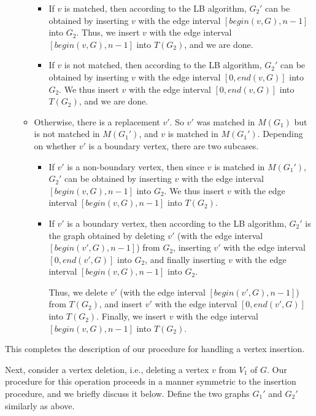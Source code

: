\documentclass[11pt]{article}
\begin{document}
\begin{itemize}
\begin{itemize}
\begin{itemize}
\item
If $v$ is matched, then according to the LB algorithm, $G_2'$ can be
obtained by inserting $v$ with the edge interval $[begin(v,G),n-1]$ into $G_2$. Thus,
we insert $v$ with the edge interval $[begin(v,G),n-1]$ into $T(G_2)$, and we are
done.

\item
If $v$ is not matched, then according to the LB algorithm, $G_2'$ can be
obtained by inserting $v$ with the edge interval $[0, end(v,G)]$ into $G_2$.
We thus insert $v$ with the edge interval $[0, end(v,G)]$ into $T(G_2)$, and we are done.

\end{itemize}

\item
Otherwise, there is a replacement $v'$. So $v'$
was matched in $M(G_1)$ but is not matched in $M(G_1')$, and $v$ is
matched in $M(G_1')$. Depending on whether $v'$ is a boundary vertex, there are two
subcases.

\begin{itemize}
\item
If $v'$ is a non-boundary vertex, then since $v$ is
matched in $M(G_1')$, $G_2'$ can be
obtained by inserting $v$ with the edge interval $[begin(v,G),n-1]$ into $G_2$.
We thus insert $v$ with the edge interval $[begin(v,G),n-1]$ into $T(G_2)$.


\item
If $v'$ is a boundary vertex, then according to the LB algorithm,
$G_2'$ is the graph obtained by deleting $v'$ (with the edge interval
$[begin(v',G),n-1]$) from $G_2$, inserting $v'$ with the edge interval $[0,end(v',G)]$ into
$G_2$, and finally inserting $v$ with the edge interval $[begin(v,G),n-1]$ into $G_2$.

Thus, we delete $v'$ (with the edge interval $[begin(v',G),n-1]$) from $T(G_2)$, and insert
$v'$ with the edge interval $[0,end(v',G)]$ into $T(G_2)$.
Finally, we insert $v$ with the edge interval $[begin(v,G),n-1]$ into $T(G_2)$.
\end{itemize}

\end{itemize}
\end{itemize}

This completes the description of our procedure for handling a vertex insertion.

Next, consider a vertex deletion, i.e., deleting a vertex $v$ from $V_1$ of
$G$. Our procedure for this operation proceeds in a manner symmetric to the insertion
procedure, and we briefly discuss it below. Define the two graphs $G_1'$ and $G_2'$ similarly as above.
\end{document}
